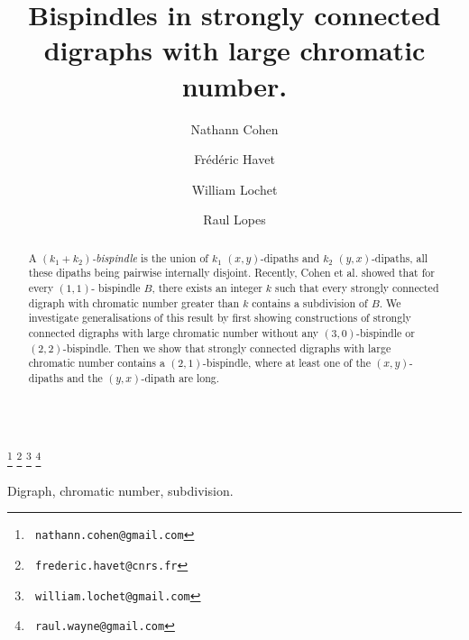 \documentclass{endm}
\begin{document}
\begin{verbatim}\end{verbatim}\vspace{2.5cm}

\begin{frontmatter}

\title{Bispindles in strongly connected digraphs with large chromatic number.}

\author{Nathann Cohen}
\address{CNRS, LRI, Univ. Paris Sud, Orsay, France}

\author{Fr\'ed\'eric Havet}
\address{ Univ. C\^ote d'Azur, CNRS, I3S, INRIA, France}


\author{William Lochet}
\address{ Univ. C\^ote d'Azur, CNRS, I3S, INRIA, and LIP, ENS Lyon, France}

\author{Raul Lopes}
\address{Departamento de Computa\c{c}ao, Universidade Federal do Cear\'a, Fortaleza, Brazil}



   \thanks[mail1]{\texttt{\normalshape
  nathann.cohen@gmail.com}} 
  \thanks[mail2]{\texttt{\normalshape
  frederic.havet@cnrs.fr}} 
  \thanks[mail3]{\texttt{\normalshape
  william.lochet@gmail.com}}
  \thanks[mail4]{\texttt{\normalshape
  raul.wayne@gmail.com}}


\begin{abstract}
A {\it $(k_1+k_2)$-bispindle} is the union of $k_1$  $(x,y)$-dipaths and $k_2$ $(y,x)$-dipaths, all these dipaths being pairwise internally disjoint.
Recently, Cohen et al. showed that for every $(1,1)$- bispindle $B$, there exists an integer $k$ such that every strongly connected
digraph with chromatic number greater than $k$ contains a subdivision of $B$. We investigate generalisations of
this result by first showing constructions of strongly connected digraphs with large chromatic number without any $(3,0)$-bispindle
or $(2,2)$-bispindle. Then we show that strongly connected digraphs with large chromatic number contains a 
$(2,1)$-bispindle, where at least one of the $(x,y)$-dipaths and the $(y,x)$-dipath are long.    
\end{abstract}

\begin{keyword}
Digraph, chromatic number, subdivision.
\end{keyword}

\end{frontmatter}
\end{document}
